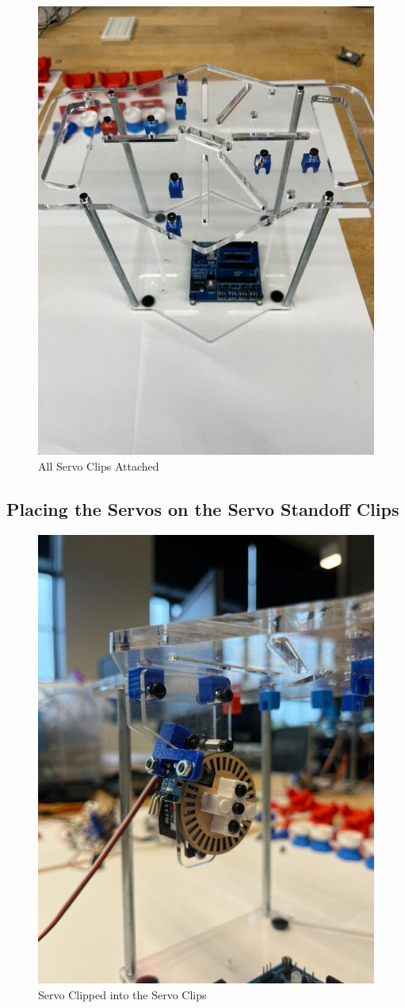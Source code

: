 \documentclass{article}
\begin{document}
\begin{figure}[H]
    \centering
    \includegraphics[width=0.5\linewidth]{PCBImages/StandoffClips/standoff_clips_7.jpg}
    \caption{All Servo Clips Attached}
    \label{fig:all_servo_clips_attached}
\end{figure}
\subsection{Placing the Servos on the Servo Standoff Clips}
\begin{figure}[H]
    \centering
    \includegraphics[width=0.5\linewidth]{PCBImages/AttachingServos/attaching_servos_1.jpg}
    \caption{Servo Clipped into the Servo Clips}
    \label{fig:servo_clipped_into_clips}
\end{figure}
\end{document}
